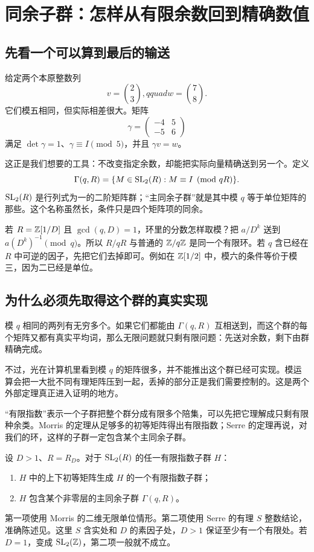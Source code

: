\chapter{同余子群：怎样从有限余数回到精确数值}\label{ch:congruence}
\section{先看一个可以算到最后的输送}
给定两个本原整数列
\[v=\binom23,qquad w=\binom78.
\]
它们模五相同，但实际相差很大。矩阵
\[\gamma=\begin{pmatrix}-4&5\\-5&6\end{pmatrix}
\]
满足 $\det\gamma=1$、$\gamma\equiv I\pmod5$，并且 $\gamma v=w$。

这正是我们想要的工具：不改变指定余数，却能把实际向量精确送到另一个。定义
\[\Gamma(q,R)=\{M\in\operatorname{SL}_2(R):M\equiv I\pmod{qR}\}.
\]
$\operatorname{SL}_2(R)$ 是行列式为一的二阶矩阵群；“主同余子群”就是其中模 $q$ 等于单位矩阵的那些。这个名称虽然长，条件只是四个矩阵项的同余。

若 $R=\mathbb Z[1/D]$ 且 $\gcd(q,D)=1$，环里的分数怎样取模？把 $a/D^k$ 送到 $a(D^k)^{-1}\pmod q$。所以 $R/qR$ 与普通的 $\mathbb Z/q\mathbb Z$ 是同一个有限环。若 $q$ 含已经在 $R$ 中可逆的因子，先把它们去掉即可。例如在 $\mathbb Z[1/2]$ 中，模六的条件等价于模三，因为二已经是单位。

\section{为什么必须先取得这个群的真实实现}
模 $q$ 相同的两列有无穷多个。如果它们都能由 $\Gamma(q,R)$ 互相送到，而这个群的每个矩阵又都有真实平均词，那么无限问题就只剩有限问题：先送对余数，剩下由群精确完成。

不过，光在计算机里看到模 $q$ 的矩阵很多，并不能推出这个群已经可实现。模运算会把一大批不同有理矩阵压到一起，丢掉的部分正是我们需要控制的。这是两个外部定理真正进入证明的地方。

“有限指数”表示一个子群把整个群分成有限多个陪集，可以先把它理解成只剩有限种余类。Morris 的定理从足够多的初等矩阵得出有限指数；Serre 的定理再说，对我们的环，这样的子群一定包含某个主同余子群。
\begin{theorem}\label{thm:arithmetic-external}
设 $D>1$、$R=R_D$。对于 $\operatorname{SL}_2(R)$ 的任一有限指数子群 $H$：
\begin{enumerate}
\item $H$ 中的上下初等矩阵生成 $H$ 的一个有限指数子群；
\item $H$ 包含某个非零层的主同余子群 $\Gamma(q,R)$。
\end{enumerate}
\end{theorem}
第一项使用 Morris\cite[Theorem 6.1(2)]{morris} 的二维无限单位情形。第二项使用 Serre\cite{serre} 的有理 $S$ 整数结论，准确陈述见\cite[pp.308--309]{prasad}。这里 $S$ 含实处和 $D$ 的素因子处，$D>1$ 保证至少有一个有限处。若 $D=1$，变成 $\operatorname{SL}_2(\mathbb Z)$，第二项一般就不成立。


